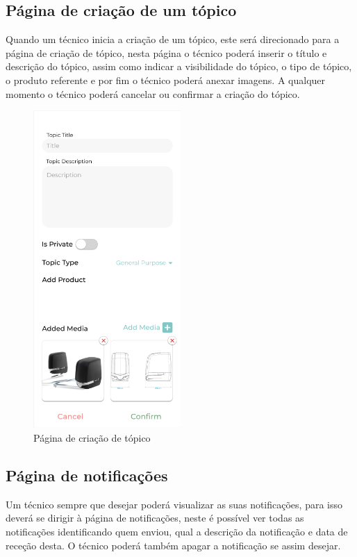 \newpage

\subsection{Página de criação de um tópico}

Quando um técnico inicia a criação de um tópico, este será direcionado para a página de criação de tópico, 
nesta página o técnico poderá inserir o título e descrição do tópico, assim como indicar a visibilidade do 
tópico, o tipo de tópico, o produto referente e por fim o técnico poderá anexar imagens. 
A qualquer momento o técnico poderá cancelar ou confirmar a criação do tópico.

\begin{figure}[htb]
    \centering
    \includegraphics[width=0.5\textwidth]{images/mockups/forum_create_topic.png}
    \caption{Página de criação de tópico}
    \label{fig:28}
\end{figure}

\subsection{Página de notificações}

Um técnico sempre que desejar poderá visualizar as suas notificações, para isso deverá se dirigir à página
de notificações, neste é possível ver todas as notificações identificando quem enviou, qual a descrição da 
notificação e data de receção desta. O técnico poderá também apagar a notificação se assim desejar.

